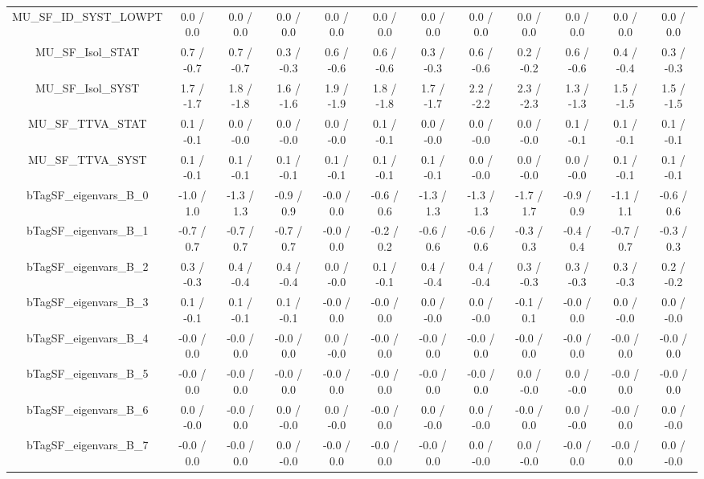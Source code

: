 \begin{table}[htbp]
\begin{center}
\begin{tabular}{|c|c|c|c|c|c|c|c|c|c|c|c|}
  MU_SF_ID_SYST_LOWPT & 0.0 / 0.0 & 0.0 / 0.0 & 0.0 / 0.0 & 0.0 / 0.0 & 0.0 / 0.0 & 0.0 / 0.0 & 0.0 / 0.0 & 0.0 / 0.0 & 0.0 / 0.0 & 0.0 / 0.0 & 0.0 / 0.0 \\ 
  MU_SF_Isol_STAT & 0.7 / -0.7 & 0.7 / -0.7 & 0.3 / -0.3 & 0.6 / -0.6 & 0.6 / -0.6 & 0.3 / -0.3 & 0.6 / -0.6 & 0.2 / -0.2 & 0.6 / -0.6 & 0.4 / -0.4 & 0.3 / -0.3 \\ 
  MU_SF_Isol_SYST & 1.7 / -1.7 & 1.8 / -1.8 & 1.6 / -1.6 & 1.9 / -1.9 & 1.8 / -1.8 & 1.7 / -1.7 & 2.2 / -2.2 & 2.3 / -2.3 & 1.3 / -1.3 & 1.5 / -1.5 & 1.5 / -1.5 \\ 
  MU_SF_TTVA_STAT & 0.1 / -0.1 & 0.0 / -0.0 & 0.0 / -0.0 & 0.0 / -0.0 & 0.1 / -0.1 & 0.0 / -0.0 & 0.0 / -0.0 & 0.0 / -0.0 & 0.1 / -0.1 & 0.1 / -0.1 & 0.1 / -0.1 \\ 
  MU_SF_TTVA_SYST & 0.1 / -0.1 & 0.1 / -0.1 & 0.1 / -0.1 & 0.1 / -0.1 & 0.1 / -0.1 & 0.1 / -0.1 & 0.0 / -0.0 & 0.0 / -0.0 & 0.0 / -0.0 & 0.1 / -0.1 & 0.1 / -0.1 \\ 
  bTagSF_eigenvars_B_0 & -1.0 / 1.0 & -1.3 / 1.3 & -0.9 / 0.9 & -0.0 / 0.0 & -0.6 / 0.6 & -1.3 / 1.3 & -1.3 / 1.3 & -1.7 / 1.7 & -0.9 / 0.9 & -1.1 / 1.1 & -0.6 / 0.6 \\ 
  bTagSF_eigenvars_B_1 & -0.7 / 0.7 & -0.7 / 0.7 & -0.7 / 0.7 & -0.0 / 0.0 & -0.2 / 0.2 & -0.6 / 0.6 & -0.6 / 0.6 & -0.3 / 0.3 & -0.4 / 0.4 & -0.7 / 0.7 & -0.3 / 0.3 \\ 
  bTagSF_eigenvars_B_2 & 0.3 / -0.3 & 0.4 / -0.4 & 0.4 / -0.4 & 0.0 / -0.0 & 0.1 / -0.1 & 0.4 / -0.4 & 0.4 / -0.4 & 0.3 / -0.3 & 0.3 / -0.3 & 0.3 / -0.3 & 0.2 / -0.2 \\ 
  bTagSF_eigenvars_B_3 & 0.1 / -0.1 & 0.1 / -0.1 & 0.1 / -0.1 & -0.0 / 0.0 & -0.0 / 0.0 & 0.0 / -0.0 & 0.0 / -0.0 & -0.1 / 0.1 & -0.0 / 0.0 & 0.0 / -0.0 & 0.0 / -0.0 \\ 
  bTagSF_eigenvars_B_4 & -0.0 / 0.0 & -0.0 / 0.0 & -0.0 / 0.0 & 0.0 / -0.0 & -0.0 / 0.0 & -0.0 / 0.0 & -0.0 / 0.0 & -0.0 / 0.0 & -0.0 / 0.0 & -0.0 / 0.0 & -0.0 / 0.0 \\ 
  bTagSF_eigenvars_B_5 & -0.0 / 0.0 & -0.0 / 0.0 & -0.0 / 0.0 & -0.0 / 0.0 & -0.0 / 0.0 & -0.0 / 0.0 & -0.0 / 0.0 & 0.0 / -0.0 & 0.0 / -0.0 & -0.0 / 0.0 & -0.0 / 0.0 \\ 
  bTagSF_eigenvars_B_6 & 0.0 / -0.0 & -0.0 / 0.0 & 0.0 / -0.0 & 0.0 / -0.0 & -0.0 / 0.0 & 0.0 / -0.0 & 0.0 / -0.0 & -0.0 / 0.0 & 0.0 / -0.0 & -0.0 / 0.0 & 0.0 / -0.0 \\ 
  bTagSF_eigenvars_B_7 & -0.0 / 0.0 & -0.0 / 0.0 & 0.0 / -0.0 & -0.0 / 0.0 & -0.0 / 0.0 & -0.0 / 0.0 & 0.0 / -0.0 & 0.0 / -0.0 & -0.0 / 0.0 & -0.0 / 0.0 & 0.0 / -0.0 \\ 

\end{tabular}
\end{center}
\end{table}

